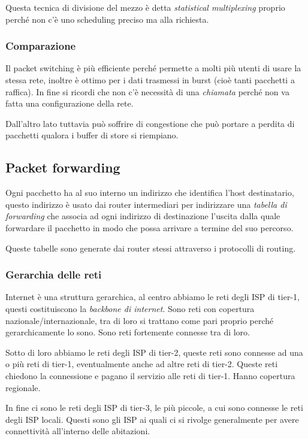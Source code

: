 Questa tecnica di divisione del mezzo è detta \emph{statistical multiplexing} proprio perché non c'è uno scheduling preciso ma alla richiesta.


\subsubsection{Comparazione}
Il packet switching è più efficiente perché permette a molti più utenti di usare la stessa rete, inoltre è ottimo per i dati trasmessi in burst (cioè tanti pacchetti a raffica). In fine si ricordi che non c'è necessità di una \emph{chiamata} perché non va fatta una configurazione della rete.

Dall'altro lato tuttavia può soffrire di congestione che può portare a perdita di pacchetti qualora i buffer di store si riempiano.

\subsection{Packet forwarding}
Ogni pacchetto ha al suo interno un indirizzo che identifica l'host destinatario, questo indirizzo è usato dai router intermediari per indirizzare una \emph{tabella di forwarding} che associa ad ogni indirizzo di destinazione l'uscita dalla quale forwardare il pacchetto in modo che possa arrivare a termine del suo percorso.

Queste tabelle sono generate dai router stessi attraverso i protocolli di routing.

\subsubsection{Gerarchia delle reti}
Internet è una struttura gerarchica, al centro abbiamo le reti degli ISP di tier-1, questi costituiscono la \emph{backbone di internet}.
Sono reti con copertura nazionale/internazionale, tra di loro si trattano come pari proprio perché gerarchicamente lo sono.
Sono reti fortemente connesse tra di loro.

Sotto di loro abbiamo le reti degli ISP di tier-2, queste reti sono connesse ad una o più reti di tier-1, eventualmente anche ad altre reti di tier-2.
Queste reti chiedono la connessione e pagano il servizio alle reti di tier-1.
Hanno copertura regionale.

In fine ci sono le reti degli ISP di tier-3, le più piccole, a cui sono connesse le reti degli ISP locali.
Questi sono gli ISP ai quali ci si rivolge generalmente per avere connettività all'interno delle abitazioni.

